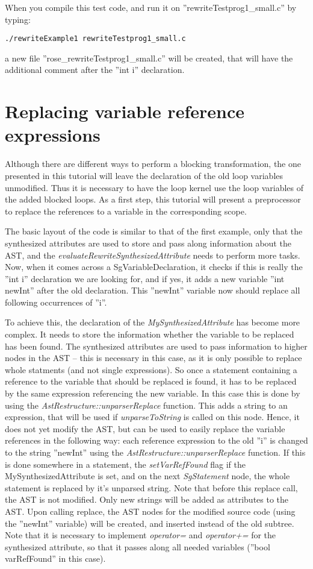 When you compile this test code, and run it on ''rewriteTestprog1\_small.c'' by typing:
\begin{verbatim}
./rewriteExample1 rewriteTestprog1_small.c
\end{verbatim}
a new file ''rose\_rewriteTestprog1\_small.c'' will be created, that will have the additional
comment after the ''int i'' declaration.


\section{Replacing variable reference expressions}

Although there are different ways to perform a blocking transformation, the one
presented in this tutorial will leave the declaration of the old loop variables 
unmodified. Thus it is necessary to have the loop kernel use the loop variables
of the added blocked loops. As a first step, this tutorial will present a preprocessor
to replace the references to a variable in the corresponding scope.

The basic layout of the code is similar to that of the first example, only
that the synthesized attributes are used to store and pass along information about the AST,
and the \emph{evaluateRewriteSynthesizedAttribute} needs to perform more tasks. Now,
when it comes across a SgVariableDeclaration, it checks if this is really the ''int i''
declaration we are looking for, and if yes, it adds a new variable ''int newInt'' after
the old declaration. This ''newInt'' variable now should replace all following occurrences
of ''i''. 

To achieve this, the declaration
of the \emph{MySynthesizedAttribute} has become more complex. It needs to store the information whether
the variable to be replaced has been found. The synthesized attributes are used to 
pass information to higher nodes in the AST -- this is necessary in this case, as it is
only possible to replace whole statments (and not single expressions). So once
a statement containing a reference to the variable that should be replaced is found,
it has to be replaced by the same expression referencing the new variable. In this
case this is done by using the \emph{AstRestructure::unparserReplace} function. This
adds a string to an expression, that will be used if \emph{unparseToString} is called
on this node. Hence, it does not yet modify the AST, but can be used to easily 
replace the variable references in the following way: each reference expression
to the old ''i'' is changed to the string ''newInt'' using the \emph{AstRestructure::unparserReplace}
function. If this is done somewhere in a statement, the \emph{setVarRefFound} flag
if the MySynthesizedAttribute is set, and on the next \emph{SgStatement} node,
the whole statement is replaced by it's unparsed string. Note that before this
replace call, the AST is not modified. Only new strings will be added as
attributes to the AST. Upon calling replace, the AST nodes for the modified source
code (using the ''newInt'' variable) will be created, and inserted instead 
of the old subtree. Note that it is necessary to implement \emph{operator=} and
\emph{operator+=} for the synthesized attribute, so that it passes along all needed
variables (''bool varRefFound'' in this case).

